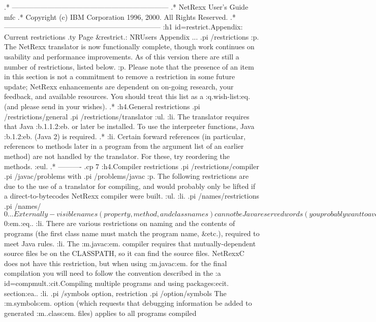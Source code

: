 .* ------------------------------------------------------------------
.* NetRexx User's Guide                                              mfc
.* Copyright (c) IBM Corporation 1996, 2000.  All Rights Reserved.
.* ------------------------------------------------------------------
:h1 id=restrict.Appendix: Current restrictions
.ty Page &restrict.: NRUsers Appendix ...
.pi /restrictions
:p.
The NetRexx translator is now functionally complete, though work
continues on usability and performance improvements.  As of this version
there are still a number of restrictions, listed below.
:p.
Please note that the presence of an item in this section is not a
commitment to remove a restriction in some future update; NetRexx
enhancements are dependent on on-going research, your feedback, and
available resources.  You should treat this list as a :q.wish-list:eq.
(and please send in your wishes).
.*
:h4.General restrictions
.pi /restrictions/general
.pi /restrictions/translator
:ul.
:li.
The translator requires that Java :b.1.1.2:eb. or later be installed.
To use the interpreter functions, Java :b.1.2:eb. (Java 2) is required.
.*
:li.
Certain forward references (in particular, references to methods later
in a program from the argument list of an earlier method) are not
handled by the translator.  For these, try reordering the methods.
:eul.
.* ----------
.cp 7
:h4.Compiler restrictions
.pi /restrictions/compiler
.pi /javac/problems with
.pi /problems/javac
:p.
The following restrictions are due to the use of a translator for
compiling, and would probably only be lifted if a direct-to-bytecodes
NetRexx compiler were built.
:ul.
:li.
.pi /names/restrictions
.pi /names/$0...
Externally-visible names (property, method, and class names) cannot be
Java reserved words (you probably want to avoid these anyway, as people
who have to write in Java cannot refer to them), and cannot start with
:q.:m.$0:em.:eq..
:li.
There are various restrictions on naming and the contents of programs
(the first class name must match the program name, &etc.), required to
meet Java rules.
:li.
The :m.javac:em. compiler requires that mutually-dependent source files
be on the CLASSPATH, so it can find the source files.
NetRexxC does not have this restriction, but when using :m.javac:em. for
the final compilation you will need to follow the convention described
in the :a id=compmult.:cit.Compiling multiple programs and using
packages:ecit. section:ea..
:li.
.pi /symbols option, restriction
.pi /option/symbols
The :m.symbols:em. option (which requests that debugging information be
added to generated :m..class:em. files) applies to all programs compiled
